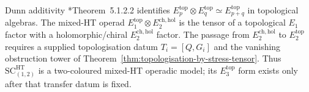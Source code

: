 \begin{rmk}\label{rmk:no-dunn-collapse}
Dunn additivity \cite{lurie-ha}*{Theorem~5.1.2.2} identifies
\(E_p^{\mathrm{top}}\otimes E_q^{\mathrm{top}}\simeq E_{p+q}^{\mathrm{top}}\)
in topological algebras.  The mixed-HT operad
\(E_1^{\mathrm{top}}\otimes E_2^{\mathrm{ch,hol}}\) is the tensor of a
topological \(E_1\) factor with a holomorphic/chiral
\(E_2^{\mathrm{ch,hol}}\) factor.  The passage from
\(E_2^{\mathrm{ch,hol}}\) to \(E_2^{\mathrm{top}}\) requires a
supplied topologisation datum \(T_i=[Q,G_i]\) and the vanishing
obstruction tower of Theorem~\ref{thm:topologisation-by-stress-tensor}.
Thus \(\mathrm{SC}^{\mathrm{HT}}_{(1,2)}\) is a two-coloured mixed-HT
operadic model; its \(E_3^{\mathrm{top}}\) form exists only after that
transfer datum is fixed.
\end{rmk}

